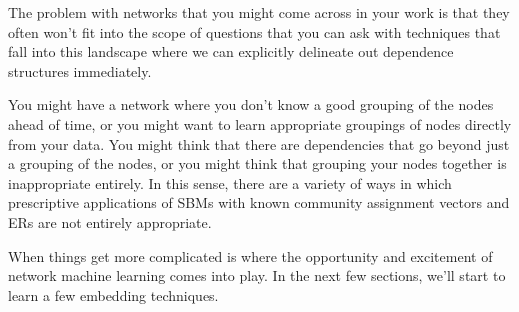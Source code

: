 The problem with networks that you might come across in your work is that they often won't fit into the scope of questions that you can ask with techniques that fall into this landscape where we can explicitly delineate out dependence structures immediately. 

You might have a network where you don't know a good grouping of the nodes ahead of time, or you might want to learn appropriate groupings of nodes directly from your data. You might think that there are dependencies that go beyond just a grouping of the nodes, or you might think that grouping your nodes together is inappropriate entirely. In this sense, there are a variety of ways in which prescriptive applications of SBMs with known community assignment vectors and ERs are not entirely appropriate.

 When things get more complicated is where the opportunity and excitement of network machine learning comes into play. In the next few sections, we'll start to learn a few embedding techniques.

\newpage